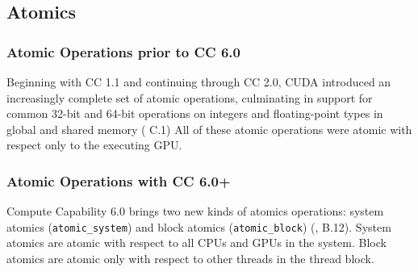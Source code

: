 \subsection{Atomics}

\subsubsection{Atomic Operations prior to CC 6.0}

Beginning with CC 1.1 and continuing through CC 2.0, CUDA introduced an increasingly complete set of atomic operations, culminating in support for common 32-bit and 64-bit operations on integers and floating-point types in global and shared memory (\cite{nvidia2008cuda20} C.1)
All of these atomic operations were atomic with respect only to the executing GPU.

\subsubsection{Atomic Operations with CC 6.0+}

Compute Capability 6.0 brings two new kinds of atomics operations: system atomics (\texttt{atomic\*\_system}) and block atomics (\texttt{atomic\*\_block}) (\cite{nvidia2017cuda80}, B.12).
System atomics are atomic with respect to all CPUs and GPUs in the system.
Block atomics are atomic only with respect to other threads in the thread block.




